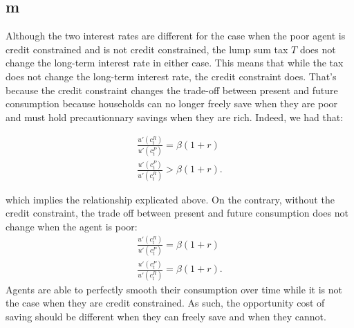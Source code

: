 \documentclass{article}
\begin{document}








\subsection{m}

Although the two interest rates are different for the case when the poor agent is credit constrained and is not credit constrained, the lump sum tax $T$ does not change the long-term interest rate in either case. This means that while the tax does not change the long-term interest rate, the credit constraint does. That's because the credit constraint changes the trade-off between present and future consumption because households can no longer freely save when they are poor and must hold precautionnary savings when they are rich. Indeed, we had that:

\begin{gather*}
    \frac{u'(c^R_t)}{u'(c^P_t)} = \beta(1+r) \\
    \frac{u'(c^P_t)}{u'(c^R_t)} > \beta(1+r).
\end{gather*}

which implies the relationship explicated above.
On the contrary, without the credit constraint, the trade off between present and future consumption does not change when the agent is poor:
\begin{gather*}
    \frac{u'(c^R_t)}{u'(c^P_t)} = \beta(1+r) \\
    \frac{u'(c^P_t)}{u'(c^R_t)} = \beta(1+r).
\end{gather*}
Agents are able to perfectly smooth their consumption over time while it is not the case when they are credit constrained. As such, the opportunity cost of saving should be different when they can freely save and when they cannot.
\end{document}

